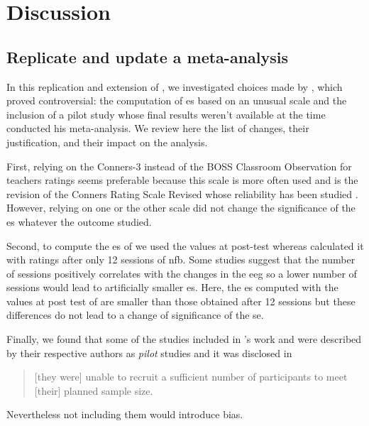 


\section{Discussion}

\subsection{Replicate and update a meta-analysis}

In this replication and extension of \citet{Cortese2016}, we investigated choices made by \citeauthor{Cortese2016}, 
which proved controversial: the computation of \gls{es} based on an unusual scale \citep{Steiner2014} and the inclusion 
of a pilot study \citep{Arnold2014} whose final results weren't available at the time \citeauthor{Cortese2016} 
conducted his meta-analysis. We review here the list of changes, their justification, and their impact on the analysis.
 
First, relying on the Conners-3 \citep{Conners2008} instead of the BOSS Classroom Observation \citep{Shapiro2010} 
for teachers ratings seems preferable because this scale is more often used \citep{Christiansen2014, 
Bluschke2016} and is the revision of the Conners Rating Scale Revised \citep{Conners1998} whose reliability has been studied 
\citep{Collett2003}. However, relying on one or the other scale did not 
change the significance of the \gls{es} whatever the outcome studied.

Second, to compute the \gls{es} of \citet{Arnold2014} we used the values at post-test
whereas \citeauthor{Cortese2016} calculated it with ratings 
after only 12 sessions of \gls{nfb}. Some studies suggest that the number of sessions positively 
correlates with the changes in the \gls{eeg} \citep{Vernon2004} so a lower number of sessions would lead to 
artificially smaller \gls{es}. Here, the \gls{es} computed with the values at post test of \citet{Arnold2014} 
are smaller than those obtained after 12 sessions but these differences do not lead to a change of significance of the \gls{se}. 

Finally, we found that some of the studies included in \citeauthor{Cortese2016}'s work 
\citep{Arnold2014} and \citep{Steiner2011} were described by their respective authors as \emph{pilot} 
studies and it was disclosed in \citet{VanDongen2013, vanDongenBoomsma2015} \begin{quote} [they were] unable to recruit a sufficient 
number of participants to meet [their] planned sample size.\end{quote} Nevertheless not including them would introduce bias.

